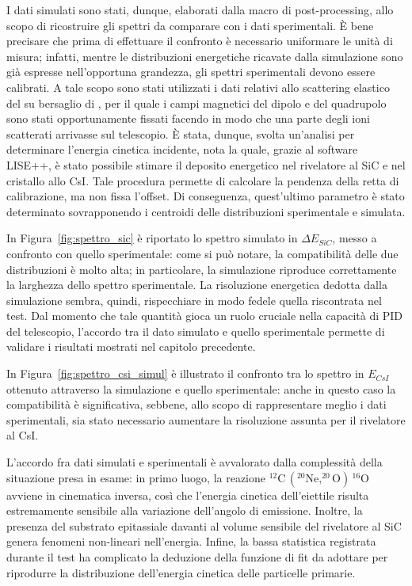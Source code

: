 I dati simulati sono stati, dunque, elaborati dalla macro di post-processing, allo scopo di ricostruire gli spettri  da comparare con i dati sperimentali.
È bene precisare che prima di effettuare il confronto è necessario uniformare le unità di misura; infatti, mentre le distribuzioni energetiche ricavate dalla simulazione sono già espresse nell'opportuna grandezza, gli spettri sperimentali devono essere calibrati.
A tale scopo sono stati utilizzati i dati relativi allo scattering elastico del  su bersaglio di , per il quale i campi magnetici del dipolo e del quadrupolo sono stati opportunamente fissati facendo  in modo che una parte degli ioni scatterati arrivasse sul telescopio.
È stata, dunque, svolta un'analisi per determinare l'energia cinetica incidente, nota la quale, grazie al software LISE++, è stato possibile stimare il deposito energetico nel rivelatore al SiC e nel cristallo allo CsI.
Tale procedura permette di calcolare la pendenza della retta di calibrazione, ma non fissa l'offset.
Di conseguenza, quest'ultimo parametro è stato determinato sovrapponendo i centroidi delle distribuzioni sperimentale e simulata.

In Figura~\ref{fig:spettro_sic} è riportato lo spettro simulato in $\Delta E_{SiC}$, messo a confronto con quello sperimentale: come si può notare, la compatibilità delle due distribuzioni è molto alta; in particolare, la simulazione riproduce correttamente la larghezza dello spettro sperimentale.
La risoluzione energetica dedotta dalla simulazione sembra, quindi, rispecchiare in modo fedele quella riscontrata nel test.
Dal momento che tale quantità gioca un ruolo cruciale nella capacità di PID del telescopio, l'accordo tra il dato simulato e quello sperimentale permette di validare i risultati mostrati nel capitolo precedente.


In Figura~\ref{fig:spettro_csi_simul} è illustrato il confronto tra lo spettro in $E_{CsI}$ ottenuto attraverso la simulazione e quello sperimentale: anche in questo caso la compatibilità è significativa, sebbene, allo scopo di rappresentare meglio i dati sperimentali, sia stato necessario aumentare la risoluzione assunta per il rivelatore al CsI.

L'accordo fra dati simulati e sperimentali è avvalorato dalla complessità della situazione presa in esame: in primo luogo, la reazione $^{12}\mbox{C}\,  ( ^{20}\mbox{Ne}, ^{20}\mbox{O} ) \, ^{16}\mbox{O} $ avviene in cinematica inversa, così che l'energia cinetica dell'eiettile risulta estremamente sensibile alla variazione dell'angolo di emissione.
Inoltre, la presenza del substrato epitassiale davanti al volume sensibile del rivelatore al SiC genera fenomeni non-lineari nell'energia.
Infine, la bassa statistica registrata durante il test ha complicato la deduzione della funzione di fit da adottare per riprodurre la distribuzione dell'energia cinetica delle particelle primarie.

